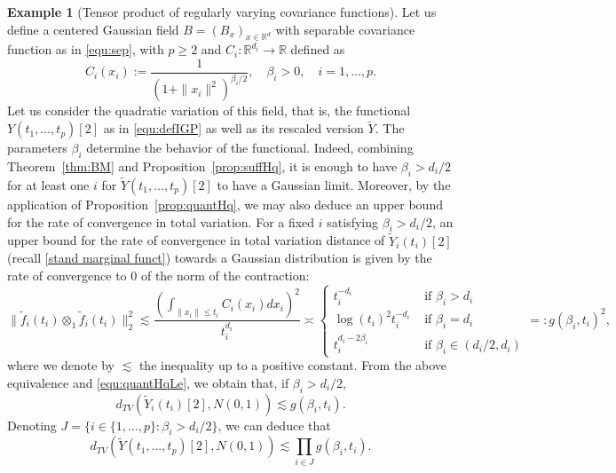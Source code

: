 \documentclass[12pt]{article}
\DeclareMathOperator{\1}{1}
\newcommand{\R}{\mathbb{R}}
\theoremstyle{plain}
\theoremstyle{definition}
\newtheorem{example}{Example}
\begin{document}
\begin{example}[Tensor product of regularly varying covariance functions] Let us define a centered Gaussian field $B=(B_x)_{x\in\R^d}$ with separable covariance function as in \eqref{equ:sep}, with $p\ge 2$ and  $C_i:\R^{d_i}\to \R$ defined as \begin{equation}
    C_i(x_i):= \frac{1}{(1+\|x_i\|^2)^{\beta_i/2}}, \quad \beta_i>0,\quad i=1,\ldots,p.
\end{equation} 
Let us consider the quadratic variation of this field, that is, the functional $Y(t_1,\ldots,t_p)[2]$ as in \eqref{equ:defIGP} as well as its rescaled version $\widetilde Y$. The parameters $\beta_i$ determine the behavior of the functional. Indeed, combining Theorem~\ref{thm:BM} and Proposition~\ref{prop:suffHq}, it is enough to have $\beta_i>d_i/2$ for at least one $i$ 
for $\widetilde Y(t_1,\dots,t_p)[2]$ to have a Gaussian limit. Moreover, by the application of Proposition~\ref{prop:quantHq}, we may also deduce an upper bound for the rate of convergence in total variation. For a fixed $i$ satisfying $\beta_i> d_i/2$, an upper bound for the rate of convergence in total variation distance of $\widetilde Y_i(t_i)[2]$ (recall \eqref{stand marginal funct}) towards a Gaussian distribution is given by the rate of convergence to $0$ of the norm of the contraction:  
\begin{equation}
    \|\widetilde f_i(t_i)\otimes_1 \widetilde  f_i(t_i)\|^2_2 \lesssim \frac{\left(\int_{{\|x_i\|\le t_i}}C_i(x_i)dx_i\right)^2}{t_i^{d_i}} \asymp \begin{cases}
                t_i^{-d_i} &\text{ if } \beta_i>d_i\\
                \log(t_i)^2t_i^{-d_i} &\text{ if } \beta_i=d_i \\
                t_i^{d_i-2\beta_i} &\text{ if } \beta_i\in(d_i/2,d_i) 
        \end{cases} =: g(\beta_i,t_i)^2,
\end{equation}
where we denote by $\lesssim$ the inequality up to a positive constant. From the above equivalence and  \eqref{equ:quantHqLe}, we obtain that, if $\beta_i>d_i/2$, \begin{equation}
	d_{TV}(\widetilde Y_i(t_i)[2],N(0,1)) \lesssim  g(\beta_i,t_i) .
\end{equation} 
Denoting $J = \{i\in \{1,\ldots,p\}: \beta_i> d_i/2\}$, we can deduce that \begin{equation}
	d_{TV}(\widetilde Y(t_1,\ldots,t_p)[2],N(0,1)) \lesssim \prod_{i\in J} g(\beta_i,t_i) .
\end{equation}
\end{example}
\end{document}
